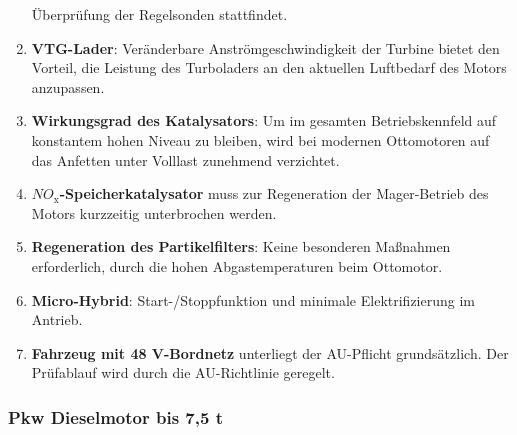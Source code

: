 \documentclass{vorlage-design-main}
\begin{document}
\begin{enumerate}
  Überprüfung der Regelsonden stattfindet.
\item
  \textbf{VTG-Lader}: Veränderbare Anströmgeschwindigkeit der Turbine
  bietet den Vorteil, die Leistung des Turboladers an den aktuellen
  Luftbedarf des Motors anzupassen.
\item
  \textbf{Wirkungsgrad des Katalysators}: Um im gesamten
  Betriebskennfeld auf konstantem hohen Niveau zu bleiben, wird bei
  modernen Ottomotoren auf das Anfetten unter Volllast zunehmend
  verzichtet.
\item
  \textbf{$NO_\text{x}$-Speicherkatalysator} muss zur Regeneration der
  Mager-Betrieb des Motors kurzzeitig unterbrochen werden.
\item
  \textbf{Regeneration des Partikelfilters}: Keine besonderen Maßnahmen
  erforderlich, durch die hohen Abgastemperaturen beim Ottomotor.
\item
  \textbf{Micro-Hybrid}: Start-/Stoppfunktion und minimale
  Elektrifizierung im Antrieb.
\item
  \textbf{Fahrzeug mit 48 V-Bordnetz} unterliegt der AU-Pflicht
  grundsätzlich. Der Prüfablauf wird durch die AU-Richtlinie geregelt.
\end{enumerate}

\subsubsection{Pkw Dieselmotor bis 7,5
t}\label{pkw-dieselmotor-bis-75-t}
\end{document}
